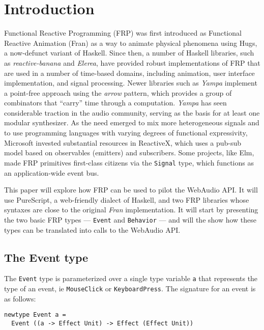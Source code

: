 \documentclass{sig-alternate}
\begin{document}
\begin{sloppypar}
  \section{Introduction}
  Functional Reactive Programming (FRP) was first introduced as Functional Reactive Animation\cite{elliott1997functional} (Fran) as a way to animate physical phenomena using Hugs, a now-defunct variant of Haskell.  Since then, a number of Haskell libraries, such as \textit{reactive-banana} and \textit{Elerea}, have provided robust implementations of FRP that are used in a number of time-based domains, including animation, user interface implementation, and signal processing.  Newer libraries such as \textit{Yampa} implement a point-free approach using the \textit{arrow} pattern, which provides a group of combinators that ``carry'' time through a computation.  \textit{Yampa} has seen considerable traction in the audio community, serving as the basis for at least one modular synthesizer.\cite{giorgidze2008switched}  As the need emerged to mix more heterogeneous signals and to use programming languages with varying degrees of functional expressivity, Microsoft invested substantial resources in ReactiveX, which uses a pub-sub model based on observables (emitters) and subscribers.\cite{maglie2016reactivex} Some projects, like Elm, made FRP primitives first-class citizens via the \texttt{Signal} type, which functions as an application-wide event bus\cite{czaplicki2013asynchronous}.


  This paper will explore how FRP can be used to pilot the WebAudio API. It will use PureScript, a web-friendly dialect of Haskell, and two FRP libraries whose syntaxes are close to the original \textit{Fran} implementation.  It will start by presenting the two basic FRP types --- \texttt{Event} and
  \texttt{Behavior} --- and will the show how these types can be translated into calls to the WebAudio API.

  \subsection{The Event type}

  The \texttt{Event} type is parameterized over a single type variable \texttt{a} that represents the type of an event, ie \texttt{MouseClick} or \texttt{KeyboardPress}.  The signature for an event is as follows:

  \begin{verbatim}
newtype Event a =
  Event ((a -> Effect Unit) -> Effect (Effect Unit))
       \end{verbatim}


\end{sloppypar}
\end{document}
